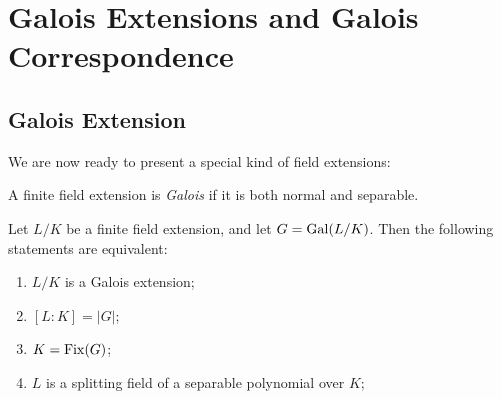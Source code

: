 \section{Galois Extensions and Galois Correspondence}

\subsection{Galois Extension}


We are now ready to present a special kind of field extensions:

\begin{definition}
    A finite field extension is \textit{Galois} if it is both normal and separable. 
\end{definition}


\begin{theorem} \label{thm:fixed}
	Let $L/K$ be a finite field extension, and let $G = \operatorname{Gal}(L/K)$. Then the following statements are equivalent:
	\begin{enumerate}[label=(\roman*)]
		\item $L/K$ is a Galois extension;
		\item $[L:K] = |G|$;
		\item $K = \operatorname{Fix}(G)$;
		\item $L$ is a splitting field of a separable polynomial over $K$;
	\end{enumerate}
\end{theorem}


